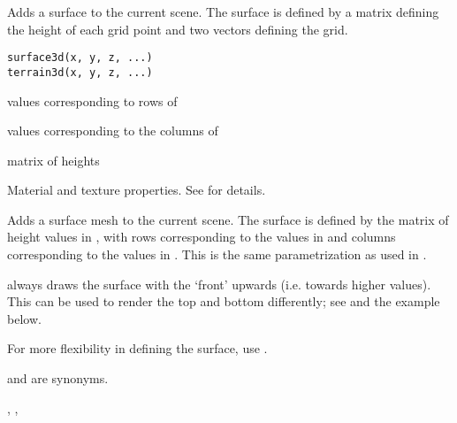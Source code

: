 \documentclass{article}
\begin{document}
\begin{Description}\relax
Adds a surface to the current scene. The surface is defined by 
a matrix defining the height of each grid point and two vectors
defining the grid.
\end{Description}
\begin{Usage}
\begin{verbatim}
surface3d(x, y, z, ...)
terrain3d(x, y, z, ...)
\end{verbatim}
\end{Usage}
\begin{Arguments}
\begin{ldescription}
\item[\code{ x }] values corresponding to rows of 

\item[\code{ y }] values corresponding to the columns of 

\item[\code{ z }] matrix of heights

\item[\code{ ... }] Material and texture properties. See  for details.
\end{ldescription}
\end{Arguments}
\begin{Details}\relax
Adds a surface mesh to the current scene. The surface is defined by 
the matrix of height values in , with rows corresponding 
to the values in  and columns corresponding to the values in 
.  This is the same parametrization as used in .

 always draws the surface with the `front' upwards
(i.e. towards higher  values).  This can be used to render
the top and bottom differently; see  and
the example below.

For more flexibility in defining the surface, use .

 and  are synonyms.
\end{Details}
\begin{SeeAlso}\relax
{}, , 
\end{SeeAlso}
\end{document}
